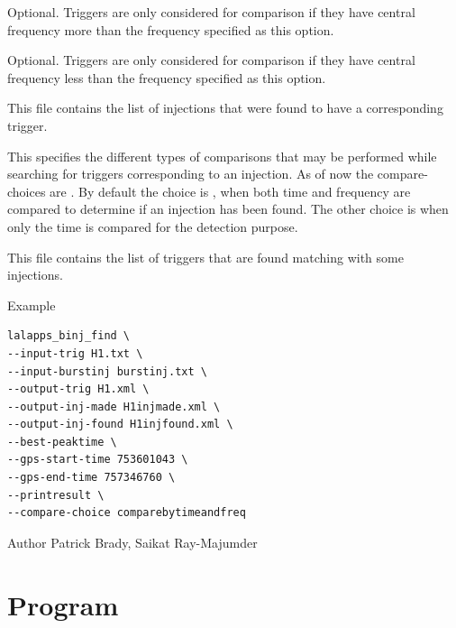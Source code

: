 \begin{entry}
\item[\option{--min-centralfreq} \parm{min-centralfreq}]
Optional.  Triggers are only considered for comparison if they have central frequency more than the 
frequency specified as this option.

\item[\option{--max-centralfreq} \parm{max-centralfreq}]
Optional.  Triggers are only considered for comparison if they have central frequency less than the 
frequency specified as this option.

\item[\option{--output-inj-found} \parm{output-inj-found}]
This file contains the list of injections that were found to have a corresponding trigger.

\item[\option{--compare-choice} \parm{compare-choice}]
This specifies the different types of comparisons that may be performed while searching 
for triggers corresponding to an injection. As of now the compare-choices are 
.  By default the choice is , 
when both time and frequency are compared to determine if an injection has been found.  The other
choice is  when only the time is compared for the detection purpose.

\item[\option{--output-trig} \parm{output-trig}]
This file contains the list of triggers that are found matching with some injections.

\item[Example]
\begin{verbatim}
lalapps_binj_find \
--input-trig H1.txt \
--input-burstinj burstinj.txt \
--output-trig H1.xml \
--output-inj-made H1injmade.xml \
--output-inj-found H1injfound.xml \
--best-peaktime \
--gps-start-time 753601043 \
--gps-end-time 757346760 \
--printresult \
--compare-choice comparebytimeandfreq
\end{verbatim}

\item[Author] 
Patrick Brady, Saikat Ray-Majumder
\end{entry}
\clearpage


\section{Program }
\label{program:lalapps-bread}


